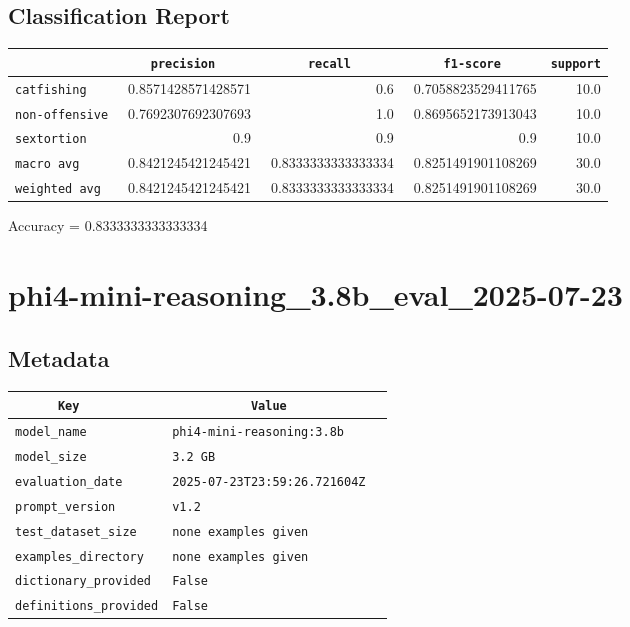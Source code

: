 \documentclass{article}
\begin{document}
\subsection{Classification Report}

\begin{center}
\begin{tabular}{l | r | r | r | r} \hline
    \verb|            | & \verb|    precision     | & \verb|      recall      | & \verb|     f1-score     | & \verb|support| \\ \hline
    \hline
    \verb|catfishing | & 0.8571428571428571 & 0.6 & 0.7058823529411765 &    10.0 \\ \hline
    \verb|non-offensive| & 0.7692307692307693 & 1.0 & 0.8695652173913043 &    10.0 \\ \hline
    \verb|sextortion | & 0.9 & 0.9 & 0.9 &    10.0 \\ \hline
    \verb|macro avg  | & 0.8421245421245421 & 0.8333333333333334 & 0.8251491901108269 &    30.0 \\ \hline
    \verb|weighted avg| & 0.8421245421245421 & 0.8333333333333334 & 0.8251491901108269 &    30.0 \\ \hline
\end{tabular}
\end{center}

\begin{center}
Accuracy = 0.8333333333333334
\end{center}

\section{phi4-mini-reasoning\_3.8b\_eval\_2025-07-23}
\subsection{Metadata}

\begin{center}
\begin{tabular}{l | l} \hline
    \verb|      Key      | & \verb|           Value           | \\ \hline
    \hline
    \verb|model_name    | & \verb|phi4-mini-reasoning:3.8b     | \\ \hline
    \verb|model_size    | & \verb|3.2 GB                       | \\ \hline
    \verb|evaluation_date| & \verb|2025-07-23T23:59:26.721604Z  | \\ \hline
    \verb|prompt_version| & \verb|v1.2                         | \\ \hline
    \verb|test_dataset_size| & \verb|none examples given          | \\ \hline
    \verb|examples_directory| & \verb|none examples given          | \\ \hline
    \verb|dictionary_provided| & \verb|False                        | \\ \hline
    \verb|definitions_provided| & \verb|False                        | \\ \hline
\end{tabular}
\end{center}
\end{document}
